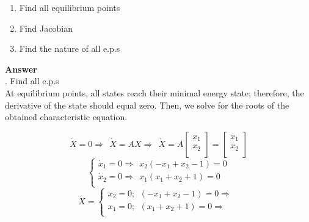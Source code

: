 \documentclass{homeworg}
\begin{document}
\begin{enumerate}[label=(\alph*)]
\item Find all equilibrium points
\item Find Jacobian
\item Find the nature of all e.p.s
\end{enumerate}

\noindent
\textbf{Answer} \\
. Find all e.p.s\\
At equilibrium points, all states reach their minimal energy state; therefore,
the derivative of the state should equal zero. Then, we solve for the roots of
the obtained characteristic equation.

\begin{equation} %
  \dot{X} = 0 \Rightarrow~~ \dot{X} = AX \Rightarrow~~ \dot{X} = A
  \begin{bmatrix}
    x_1\\
    x_2\\
  \end{bmatrix}
  =
  \begin{bmatrix}
    x_1\\
    x_2\\
  \end{bmatrix}
\end{equation}
\begin{equation}
  \begin{cases}
    \dot{x}_1 = 0 \Rightarrow~~ x_2(-x_1 + x_2 -1)=0\\
    \dot{x}_2 = 0 \Rightarrow~~ x_1(x_1 + x_2 + 1)=0\\
  \end{cases}
\end{equation}
\begin{equation} %
  \dot{X} =
  \begin{cases}
    x_2 = 0;~~(-x_1 + x_2 -1)=0 \Rightarrow~~\\
    x_1 = 0;~~(x_1 + x_2 + 1)=0 \Rightarrow~~\\
  \end{cases}
\end{equation}



%
\end{document}
